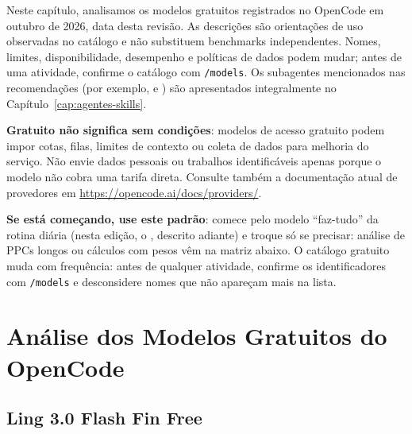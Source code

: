 Neste cap{\'i}tulo, analisamos os modelos gratuitos registrados no OpenCode em outubro de 2026, data desta revis{\~a}o. As descri{\c c}{\~o}es s{\~a}o orienta{\c c}{\~o}es de uso observadas no cat{\'a}logo e n{\~a}o substituem benchmarks independentes. Nomes, limites, disponibilidade, desempenho e pol{\'i}ticas de dados podem mudar; antes de uma atividade, confirme o cat{\'a}logo com \texttt{/models}. Os subagentes mencionados nas recomenda{\c c}{\~o}es (por exemplo,  e ) s{\~a}o apresentados integralmente no Cap{\'i}tulo~\ref{cap:agentes-skills}.

\begin{atencaopedagogica}
\textbf{Gratuito n{\~a}o significa sem condi{\c c}{\~o}es}: modelos de acesso gratuito podem impor cotas, filas, limites de contexto ou coleta de dados para melhoria do servi{\c c}o. N{\~a}o envie dados pessoais ou trabalhos identific{\'a}veis apenas porque o modelo n{\~a}o cobra uma tarifa direta.
Consulte tamb{\'e}m a documenta{\c c}{\~a}o atual de provedores em \url{https://opencode.ai/docs/providers/}.
\end{atencaopedagogica}

\begin{dicaopencode}
\textbf{Se est{\'a} come{\c c}ando, use este padr{\~a}o}: comece pelo modelo ``faz-tudo'' da rotina di{\'a}ria (nesta edi{\c c}{\~a}o, o , descrito adiante) e troque s{\'o} se precisar: an{\'a}lise de PPCs longos ou c{\'a}lculos com pesos v{\^e}m na matriz abaixo. O cat{\'a}logo gratuito muda com frequ{\^e}ncia: antes de qualquer atividade, confirme os identificadores com \texttt{/models} e desconsidere nomes que n{\~a}o apare{\c c}am mais na lista.
\end{dicaopencode}

\section{An{\'a}lise dos Modelos Gratuitos do OpenCode}

\subsection{Ling 3.0 Flash Fin Free}


